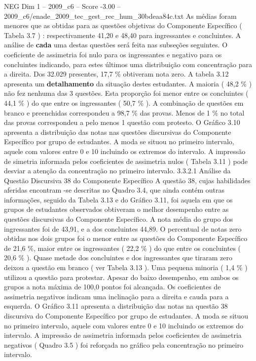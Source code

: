 \begin{textsample}{NEG Dim 1 – 2009\_c6 – Score -3.00 – 2009\_c6/enade\_2009\_tec\_gest\_rec\_hum\_30bdeaa84c.txt}
As médias foram menores que as obtidas para as questões objetivas do Componente Específico ( Tabela 3.7 ) : respectivamente 41,20 e 48,40 para ingressantes e concluintes.
A análise de \textbf{cada} uma destas questões será feita nas subseções seguintes.
O coeficiente de assimetria foi nulo para os ingressantes e negativo para os concluintes indicando, para estes últimos uma distribuição com concentração para a direita.
Dos 32.029 presentes, 17,7 \% obtiveram nota zero.
A tabela 3.12 apresenta um \textbf{detalhamento} da situação destes estudantes.
A maioria ( 48,2 \% ) não fez nenhuma das 3 questões.
Esta proporção foi menor entre os concluintes ( 44,1 \% ) do que entre os ingressantes ( 50,7 \% ).
A combinação de questões em branco e preenchidas correspondeu a 98,7 \% das provas.
Menos de 1 \% no total das provas correspondeu a pelo menos 1 questão com protesto.
O Gráfico 3.10 apresenta a distribuição das notas nas questões discursivas do Componente Específico por grupo de estudantes.
A moda se situou no primeiro intervalo, aquele com valores entre 0 e 10 incluindo os extremos do intervalo.
A impressão de simetria informada pelos coeficientes de assimetria nulos ( Tabela 3.11 ) pode desviar a atenção da concentração no primeiro intervalo. 3.3.2.1 Análise da Questão Discursiva 38 do Componente Específico A questão 38, cujas habilidades aferidas encontram -se descritas no Quadro 3.4, que ainda contém outras informações, seguido da Tabela 3.13 e do Gráfico 3.11, foi aquela em que os grupos de estudantes observados obtiveram o melhor desempenho entre as questões discursivas do Componente Específico.
A nota média do grupo dos ingressantes foi de 43,91, e a dos concluintes 44,89.
O percentual de notas zero obtidas nos dois grupos foi o menor entre as questões do Componente Específico de 21,6 \%, maior entre os ingressantes ( 22,2 \% ) do que entre os concluintes ( 20,6 \% ).
Quase metade dos concluintes e dos ingressantes que tiraram zero deixou a questão em branco ( ver Tabela 3.13 ).
Uma pequena minoria ( 1,4 \% ) utilizou a questão para protestar.
Apesar do baixo desempenho, em ambos os grupos a nota máxima de 100,0 pontos foi alcançada.
Os coeficientes de assimetria negativos indicam uma inclinação para a direita e cauda para a esquerda.
O Gráfico 3.11 apresenta a distribuição das notas na questão 38 discursiva do Componente Específico por grupo de estudantes.
A moda se situou no primeiro intervalo, aquele com valores entre 0 e 10 incluindo os extremos do intervalo.
A impressão de assimetria informada pelos coeficientes de assimetria negativos ( Quadro 3.5 ) foi reforçada no gráfico pela concentração no primeiro intervalo.

\end{textsample}
